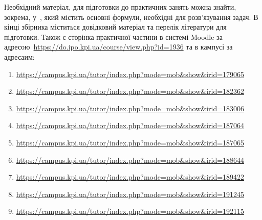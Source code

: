 \documentclass{Syllabus}
\begin{document}
Необхідний матеріал, для підготовки до практичних занять можна знайти, зокрема, у~\cite{Ivanova}, який містить основні формули, необхідні для розв'язування задач. В кінці збірника міститься довідковий матеріал та перелік літератури для підготовки. Також є сторінка практичної частини в системі Moodle за адресою~\url{https://do.ipo.kpi.ua/course/view.php?id=1936} та в кампусі за адресаим:
\begin{enumerate}[label=$\bullet$]
    \item \url{https://campus.kpi.ua/tutor/index.php?mode=mob\&show\&irid=179065}
    \item \url{https://campus.kpi.ua/tutor/index.php?mode=mob\&show\&irid=182362}
    \item \url{https://campus.kpi.ua/tutor/index.php?mode=mob\&show\&irid=183006}
    \item \url{https://campus.kpi.ua/tutor/index.php?mode=mob\&show\&irid=187064}
    \item \url{https://campus.kpi.ua/tutor/index.php?mode=mob\&show\&irid=187065}
    \item \url{https://campus.kpi.ua/tutor/index.php?mode=mob\&show\&irid=188644}
    \item \url{https://campus.kpi.ua/tutor/index.php?mode=mob\&show\&irid=189422}
    \item \url{https://campus.kpi.ua/tutor/index.php?mode=mob\&show\&irid=191245}
    \item \url{https://campus.kpi.ua/tutor/index.php?mode=mob\&show\&irid=192115}
\end{enumerate}
\end{document}
